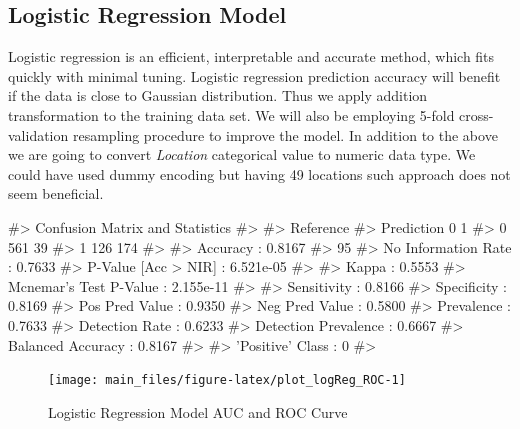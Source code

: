 \hypertarget{logistic-regression-model}{%
\subsection{Logistic Regression Model}\label{logistic-regression-model}}

Logistic regression is an efficient, interpretable and accurate method,
which fits quickly with minimal tuning. Logistic regression prediction
accuracy will benefit if the data is close to Gaussian distribution.
Thus we apply addition transformation to the training data set. We will
also be employing 5-fold cross-validation resampling procedure to
improve the model. In addition to the above we are going to convert
\emph{Location} categorical value to numeric data type. We could have
used dummy encoding but having 49 locations such approach does not seem
beneficial.

\begin{Schunk}
\begin{Soutput}
#> Confusion Matrix and Statistics
#> 
#>           Reference
#> Prediction   0   1
#>          0 561  39
#>          1 126 174
#>                                           
#>                Accuracy : 0.8167          
#>                  95%
#>     No Information Rate : 0.7633          
#>     P-Value [Acc > NIR] : 6.521e-05       
#>                                           
#>                   Kappa : 0.5553          
#>  Mcnemar's Test P-Value : 2.155e-11       
#>                                           
#>             Sensitivity : 0.8166          
#>             Specificity : 0.8169          
#>          Pos Pred Value : 0.9350          
#>          Neg Pred Value : 0.5800          
#>              Prevalence : 0.7633          
#>          Detection Rate : 0.6233          
#>    Detection Prevalence : 0.6667          
#>       Balanced Accuracy : 0.8167          
#>                                           
#>        'Positive' Class : 0               
#> 
\end{Soutput}
\end{Schunk}

\begin{Schunk}
\begin{figure}[H]

{\centering \texttt{[image: main\_files/figure-latex/plot\_logReg\_ROC-1]} 

}

\caption[Logistic Regression Model AUC and ROC Curve]{Logistic Regression Model AUC and ROC Curve}\label{fig:plot_logReg_ROC}
\end{figure}
\end{Schunk}

